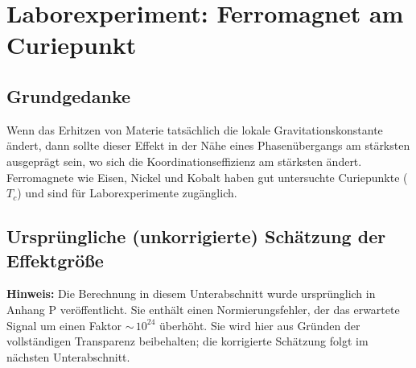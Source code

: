 \documentclass[12pt]{article}
\theoremstyle{remark}
\begin{document}
	\section{Laborexperiment: Ferromagnet am Curiepunkt}
	\label{sec:lab}
	
	\subsection{Grundgedanke}
	\label{subsec:lab-rationale}
	
	Wenn das Erhitzen von Materie tatsächlich die lokale Gravitationskonstante ändert, dann sollte dieser Effekt in der Nähe eines Phasenübergangs am stärksten ausgeprägt sein, wo sich die Koordinationseffizienz am stärksten ändert. Ferromagnete wie Eisen, Nickel und Kobalt haben gut untersuchte Curiepunkte ($T_c$) und sind für Laborexperimente zugänglich.
	
	\subsection{Ursprüngliche (unkorrigierte) Schätzung der Effektgröße}
	\label{subsec:lab-estimate-uncorrected}
	
	\textbf{Hinweis:} Die Berechnung in diesem Unterabschnitt wurde ursprünglich in Anhang P veröffentlicht. Sie enthält einen Normierungsfehler, der das erwartete Signal um einen Faktor ${\sim}\,10^{24}$ überhöht. Sie wird hier aus Gründen der vollständigen Transparenz beibehalten; die korrigierte Schätzung folgt im nächsten Unterabschnitt.
	
\end{document}

